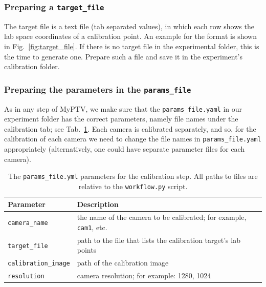 \documentclass[10pt,a4paper]{article}
\begin{document}
\subsubsection{Preparing a \texttt{target\_file}}\label{sec:target_file}

The target file is a text file (tab separated values), in which each row shows the lab space coordinates of a calibration point.  An example for the format is shown in Fig.~\ref{fig:target_file}. If there is no target file in the experimental folder, this is the time to generate one. Prepare such a file and save it in the experiment's calibration folder.




\subsubsection{Preparing the parameters in the \texttt{params\_file}}

As in any step of MyPTV, we make sure that the \texttt{params\_file.yaml} in our experiment folder has the correct parameters, namely file names under the calibration tab; see Tab.~\ref{tab:cal_paramsfile}. Each camera is calibrated separately, and so, for the calibration of each camera we need to change the file names in \texttt{params\_file.yaml} appropriately (alternatively, one could have separate parameter files for each camera).  

\begin{table}
	\centering
	\caption{The \texttt{params\_file.yml} parameters for the calibration step. All paths to files are relative to the \texttt{workflow.py} script. \label{tab:cal_paramsfile}}
	\begin{tabular}{l m{10cm}}
		\hline
		Parameter & Description\\
		\hline
		\texttt{camera\_name} & the name of the camera to be calibrated; for example, \texttt{cam1}, etc. \\
		
		
		\texttt{target\_file} & path to the file that lists the calibration target's lab points \\
		
		
		\texttt{calibration\_image} & path of the calibration image \\
		
		\texttt{resolution} & camera resolution; for example: 1280, 1024\\
		\hline
	\end{tabular}
\end{table}
\end{document}
